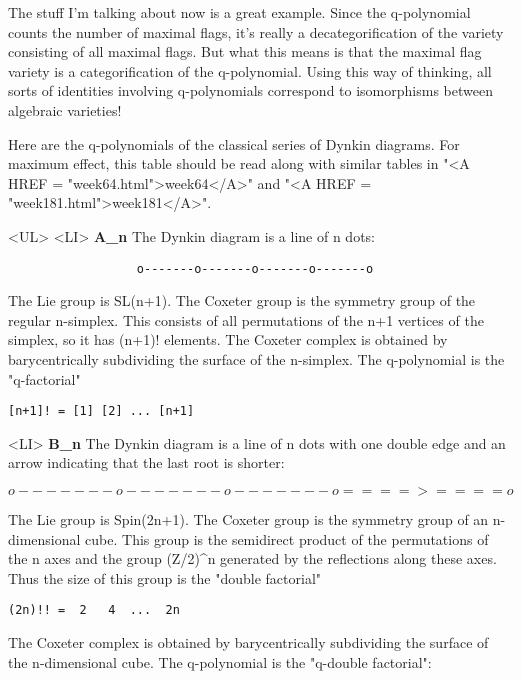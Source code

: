 The stuff I'm talking about now is a great example.  Since the 
q-polynomial counts the number of maximal flags, it's really a 
decategorification of the variety consisting of all maximal 
flags.  But what this means is that the maximal flag variety 
is a categorification of the q-polynomial.  Using this way of 
thinking, all sorts of identities involving q-polynomials 
correspond to isomorphisms between algebraic varieties! 

Here are the q-polynomials of the classical series of Dynkin 
diagrams.  For maximum effect, this table should be read along 
with similar tables in "<A HREF = "week64.html">week64</A>" and "<A HREF = "week181.html">week181</A>".   

<UL>
<LI>
\textbf{A_{n}} The Dynkin diagram is a line of n dots:

\begin{verbatim}
                  o-------o-------o-------o-------o
\end{verbatim}
    
The Lie group is SL(n+1).   The Coxeter group is the symmetry group of 
the regular n-simplex.  This consists of all permutations of the n+1
vertices of the simplex, so it has (n+1)! elements.  The Coxeter complex
is obtained by barycentrically subdividing the surface of the n-simplex.  
The q-polynomial is the "q-factorial"

\begin{verbatim}
[n+1]! = [1] [2] ... [n+1]
\end{verbatim}
    
<LI>
\textbf{B_{n}} 
The Dynkin diagram is a line of n dots with one double edge
and an arrow indicating that the last root is shorter:

$$
                 o-------o-------o-------o====>====o 
$$
    
The Lie group is Spin(2n+1).  The Coxeter group is the symmetry group of 
an n-dimensional cube.  This group is the semidirect product of the 
permutations of the n axes and the group (Z/2)^{n} generated by the
reflections along these axes.   Thus the size of this group is the 
"double factorial" 

\begin{verbatim}
(2n)!! =  2   4  ...  2n
\end{verbatim}
    
The Coxeter complex is obtained by barycentrically subdividing the
surface of the n-dimensional cube.  The q-polynomial is the 
"q-double factorial":

